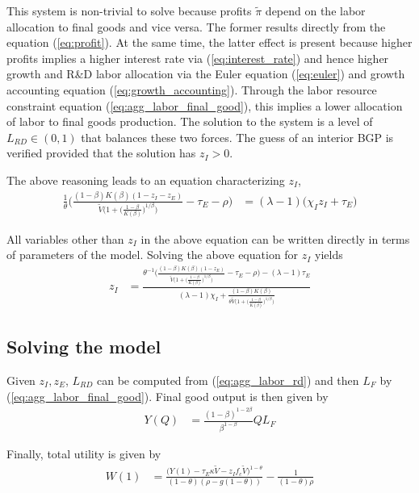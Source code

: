 \documentclass[12pt,english]{article}
\theoremstyle{remark}
\begin{document}
This system is non-trivial to solve because profits $\tilde{\pi}$ depend on the labor allocation to final goods and vice versa. The former results directly from the equation (\ref{eq:profit}). At the same time, the latter effect is present because higher profits implies a higher interest rate via (\ref{eq:interest_rate}) and hence higher growth and R\&D labor allocation via the Euler equation (\ref{eq:euler}) and growth accounting equation (\ref{eq:growth_accounting}). Through the labor resource constraint equation (\ref{eq:agg_labor_final_good}), this implies a lower allocation of labor to final goods production. The solution to the system is a level of $L_{RD} \in (0,1)$ that balances these two forces. The guess of an interior BGP is verified provided that the solution has $z_I > 0$. 

The above reasoning leads to an equation characterizing $z_I$, 
\begin{align}
	\frac{1}{\theta} \Bigg( \frac{(1-\beta)K(\beta)(1- z_I - z_E)}{\tilde{V}\Big(1 + \big(\frac{1-\beta}{K(\beta)}\big)^{1/\beta}\Big)} - \tau_E - \rho \Bigg) &= (\lambda - 1)\big(\chi_Iz_I + \tau_E \big)
\end{align}

All variables other than $z_I$ in the above equation can be written directly in terms of parameters of the model. Solving the above equation for $z_I$ yields
\begin{align}
	z_I &= \frac{\theta^{-1}\Bigg( \frac{(1-\beta)K(\beta)(1- z_E)}{\tilde{V}\big(1 + \big(\frac{1-\beta}{K(\beta)}\big)^{1/\beta}\big)} - \tau_E - \rho \Bigg) - (\lambda-1) \tau_E}{(\lambda - 1) \chi_I + \frac{(1-\beta)K(\beta)}{\theta \tilde{V}\big(1 + \big(\frac{1-\beta}{K(\beta)}\big)^{1/\beta}\big)}} \label{eq:effort_incumbent}
\end{align}

\subsection{Solving the model}

Given $z_I,z_E$, $L_{RD}$ can be computed from (\ref{eq:agg_labor_rd}) and then $L_F$ by (\ref{eq:agg_labor_final_good}). Final good output is then given by
\begin{align}
	Y(Q) &= \frac{(1-\beta)^{1-2\beta}}{\beta^{1-\beta}} Q L_F \label{eq:agg_final_good_output}
\end{align}

Finally, total utility is given by 
\begin{align}
	W(1) &= \frac{\big(Y(1) - \tau_E \kappa \tilde{V} - z_I f_c \tilde{V}\big)^{1-\theta}}{(1-\theta)(\rho - g(1-\theta))} - \frac{1}{(1-\theta)\rho} \label{eq:agg_welfare}
\end{align}
\end{document}
